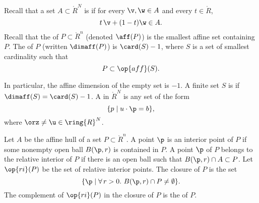 \begin{definition}\label{def:affine} 
Recall that a set $A\subset\ring{R}^N$ is  if for
every $\v,\w\in A$ and every $t \in \ring{R}$, 
\begin{displaymath}
  t\, \v + (1-t) \w \in A.
\end{displaymath}
Recall that
the  of $P\subset\ring{R}^n$ (denoted $\aff(P)$) 
is the smallest affine set
containing $P$.  The  of $P$ (written $\dimaff(P)$) is
$\card(S)-1$, where $S$ is a set of smallest cardinality such that
\begin{displaymath}
P \subset \op{aff}(S).
\end{displaymath}
\end{definition}
In particular, the affine dimension of the empty set is $-1$.
A finite set $S$ is  if $\dimaff(S) = \card(S)-1$.
A  in $\ring{R}^N$ is any set of the form
\begin{displaymath}
\{p\mid u\cdot \p = b\},
\end{displaymath}
where $\orz\ne\u\in\ring{R}^N$.
%
%



\begin{definition}
Let
$A$ be the affine hull of a set $P\subset\ring{R}^n$.  A point $\p$ is an interior
point of $P$ if some nonempty open ball $B(\p,r)$ is
contained in $P$.  A point $\p$ of $P$ belongs to the
relative interior of $P$ if there is an open ball such that $B(\p,r)
\cap A\subset P$.  Let $\op{ri}(P)$ be the set of relative interior
points.  The closure of $P$ is the set
\begin{displaymath}
\{\p \mid \forall\,r >0.~ B(\p,r) \cap P \ne \emptyset\}.
\end{displaymath}
The complement of $\op{ri}(P)$ in the closure of $P$ is the 
 of $P$.
\end{definition}
%
%
%
%
%
%
%

